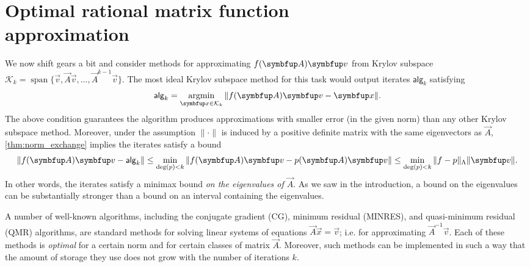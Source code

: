 \chapter{Optimal rational matrix function\\ approximation}
\label{chap:opt_algs}

We now shift gears a bit and consider methods for approximating \( \fA\vec{v} \) from Krylov subspace \( \mathcal{K}_k = \operatorname{span}\{\vec{v}, \vec{A}\vec{v}, \ldots, \vec{A}^{k-1}\vec{v} \} \).
The most ideal Krylov subspace method for this task would output iterates \( \mathsf{alg}_k \) satisfying
\begin{equation*}
    \mathsf{alg}_k = \argmin_{\vec{x}\in\mathcal{K}_k} \| \fA \vec{v} - \vec{x} \|.
\end{equation*}
The above condition guarantees the algorithm produces approximations with smaller error (in the given norm) than any other Krylov subspace method. 
Moreover, under the assumption \( \|\cdot\| \) is induced by a positive definite matrix with the same eigenvectors as \( \vec{A} \), \cref{thm:norm_exchange} implies the iterates satisfy a bound
\begin{equation*}
    \| \fA\vec{v} - \mathsf{alg}_k \| 
    \leq \min_{\deg(p) < k} \| \fA \vec{v} - \pA \vec{v} \|
    \leq \min_{\deg(p) < k} \| f - p \|_\Lambda \| \vec{v} \|.
\end{equation*}
In other words, the iterates satisfy a minimax bound \emph{on the eigenvalues of \( \vec{A} \)}.
As we saw in the introduction, a bound on the eigenvalues can be substantially stronger than a bound on an interval containing the eigenvalues.

A number of well-known algorithms, including the conjugate gradient (CG), minimum residual (MINRES), and quasi-minimum residual (QMR) algorithms, are standard methods for solving linear systems of equations $\vec{A}\vec{x} = \vec{v}$; i.e. for approximating $\vec{A}^{-1} \vec{v}$.
Each of these methods is \emph{optimal} for a certain norm and for certain classes of matrix \( \vec{A} \).
Moreover, such methods can be implemented in such a way that the amount of storage they use does not grow with the number of iterations \( k \). 


